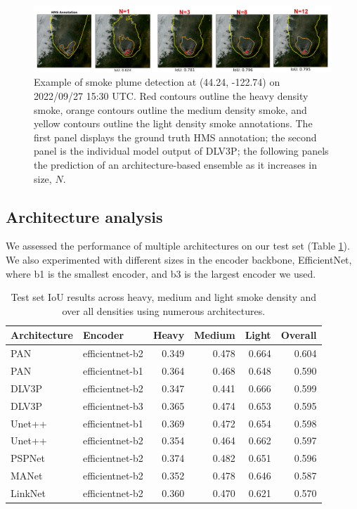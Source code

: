 \documentclass{article}
\begin{document}
\begin{figure}[h]
    \centering
    \includegraphics[width=\textwidth]{smoothing_ex.png}
    \caption{Example of smoke plume detection at (44.24, -122.74) on 2022/09/27 15:30 UTC. Red contours outline the heavy density smoke, orange contours outline the medium density smoke, and yellow contours outline the light density smoke annotations. The first panel displays the ground truth HMS annotation; the second panel is the individual model output of DLV3P; the following panels the prediction of an architecture-based ensemble as it increases in size, $N$.}
    \label{fig:smoothing_ex}
\end{figure}

\newpage
\subsection{Architecture analysis}\label{sec:arch-exp}
We assessed the performance of multiple architectures on our test set (Table \ref{tab:arch-results}). We also experimented with different sizes in the encoder backbone, EfficientNet, where b1 is the smallest encoder, and b3 is the largest encoder we used.

\begin{table}[h]
    \centering
    \caption{Test set IoU results across heavy, medium and light smoke density and over all densities using numerous architectures.}
    \label{tab:arch-results}
    \begin{tabular}{llrrrr}
        \hline
        Architecture   & Encoder &  Heavy &   Medium &   Light &   Overall \\
        \hline
        PAN & efficientnet-b2 &  0.349 &     0.478 &  0.664 &      0.604 \\
        PAN & efficientnet-b1 &   0.364 &     0.468 &  0.648 &      0.590  \\
        DLV3P & efficientnet-b2 &  0.347 &     0.441 &  0.666 &      0.599  \\
        DLV3P  & efficientnet-b3 &   0.365 &     0.474 &  0.653 &      0.595 \\
        Unet++ & efficientnet-b1 &  0.369 &     0.472 &  0.654 &     0.598  \\
        Unet++ & efficientnet-b2 &   0.354 &     0.464 &  0.662 &      0.597  \\
        PSPNet & efficientnet-b2 &  0.374 &     0.482 &  0.651 &      0.596  \\
        MANet & efficientnet-b2 &  0.352 &     0.478 &  0.646 &      0.587  \\
        LinkNet & efficientnet-b2 &   0.360 &     0.470 &  0.621 &      0.570  \\
         \hline
    \end{tabular}
    \end{table}
\end{document}
